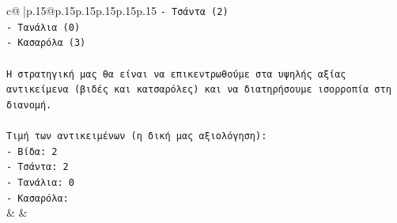 \documentclass{article}
\begin{document}
{\begin{supertabular}{c@{$\;$}|p{.15\linewidth}@{}p{.15\linewidth}p{.15\linewidth}p{.15\linewidth}p{.15\linewidth}p{.15\linewidth}}
{{{\texttt{{-} Τσάντα (2)} \\
\texttt{{-} Τανάλια (0)} \\
\texttt{{-} Κασαρόλα (3)} \\
\\ 
\texttt{Η στρατηγική μας θα είναι να επικεντρωθούμε στα υψηλής αξίας αντικείμενα (βιδές και κατσαρόλες) και να διατηρήσουμε ισορροπία στη διανομή.} \\
\\ 
\texttt{Τιμή των αντικειμένων (η δική μας αξιολόγηση):} \\
\texttt{{-} Βίδα: 2} \\
\texttt{{-} Τσάντα: 2} \\
\texttt{{-} Τανάλια: 0} \\
\texttt{{-} Κασαρόλα:} \\
            }
        }
    }
    & & \\ \\


\end{supertabular}}
\end{document}
